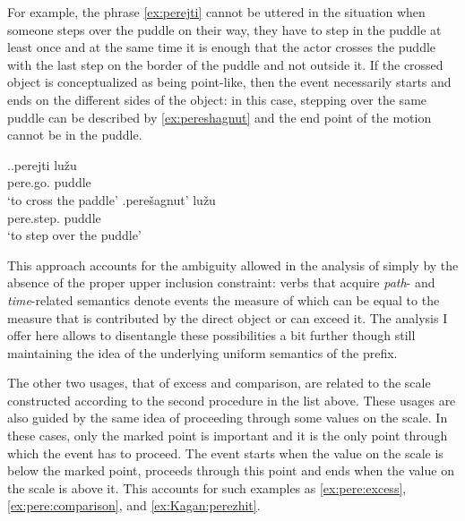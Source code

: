 For example, the phrase \ref{ex:perejti} cannot be uttered in the situation when someone steps over the puddle on their way, they have to step in the puddle at least once and at the same time it is enough that the actor crosses the puddle with the last step on the border of the puddle and not outside it. If the crossed object is conceptualized as being point-like, then the event necessarily starts and ends on the different sides of the object: in this case, stepping over the same puddle can be described by \ref{ex:pereshagnut} and the end point of the motion cannot be in the puddle.


\ex.\ag.\label{ex:perejti}perejti lu\v{z}u\\
pere.go. puddle\\
\vspace{0.5em}
`to cross the paddle'
\bg.\label{ex:pereshagnut}pere\v{s}agnut' lu\v{z}u\\
pere.step. puddle\\
\vspace{0.5em}
`to step over the puddle'

This approach accounts for the ambiguity allowed in the analysis of \citet{Kagan:book} simply by the absence of the proper upper inclusion constraint: verbs that acquire \textit{path}- and \textit{time}-related semantics denote events the measure of which can be equal to the measure that is contributed by the direct object or can exceed it. The analysis I offer here allows to disentangle these possibilities a bit further though still maintaining the idea of the underlying uniform semantics of the prefix.

The other two usages, that of excess and comparison, are related to the scale constructed according to the second procedure in the list above. These usages are also guided by the same idea of proceeding through some values on the scale. In these cases, only the marked point is important and it is the only point through which the event has to proceed. The event starts when the value on the scale is below the marked point, proceeds through this point and ends when the value on the scale is above it. This accounts for such examples as \ref{ex:pere:excess}, \ref{ex:pere:comparison}, and \ref{ex:Kagan:perezhit}.

